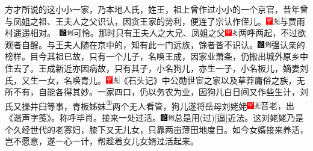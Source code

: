 方才所说的这小小一家，乃本地人氏，姓王，祖上曾作过小小的一个京官，昔年曾与凤姐之祖、王夫人之父识认，因贪王家的势利，便连了宗认作侄儿。{{\includegraphics[width=3mm]{../Images/00002}\includegraphics[width=3mm]{../Images/00012}\footnotesize \kaishu 与贾雨村遥遥相对。　}\includegraphics[width=3mm]{../Images/00006}\includegraphics[width=3mm]{../Images/00011}\footnotesize \kaishu 可怜。}那时只有王夫人之大兄、凤姐之父{\includegraphics[width=3mm]{../Images/00002}\includegraphics[width=3mm]{../Images/00012}\footnotesize \kaishu 两呼两起，不过欲观者自醒。}与王夫人随在京中的，知有此一门远族，馀者皆不识认。{\includegraphics[width=3mm]{../Images/00006}\includegraphics[width=3mm]{../Images/00011}\footnotesize \kaishu 强认亲的榜样。}目今其祖已故，只有一个儿子，名唤王成，因家业萧条，仍搬出城外原乡中住去了。王成新近亦因病故，只有其子，小名狗儿，亦生一子，小名板儿，嫡妻刘氏，又生一女，名唤青儿。{\includegraphics[width=3mm]{../Images/00002}\includegraphics[width=3mm]{../Images/00012}\footnotesize \kaishu 《石头记》中公勋世宦之家以及草莽庸俗之族，无所不有，自能各得其妙。}一家四口，仍以务农为业，因狗儿白日间又作些生计，刘氏又操井臼等事，青板姊妹\href{../Text/part0010_split_000.html\#lnkback_1_a}{\textsuperscript{①}}两个无人看管，狗儿遂将岳母刘姥姥{\includegraphics[width=3mm]{../Images/00002}\includegraphics[width=3mm]{../Images/00012}\footnotesize \kaishu 音老，出《谐声字笺》。称呼毕肖。}接来一处过活。{\includegraphics[width=3mm]{../Images/00006}\includegraphics[width=3mm]{../Images/00011}\footnotesize \kaishu 总是用{(过)}{[}逼{]}近法。}这刘姥姥乃是个久经世代的老寡妇，膝下又无儿女，只靠两亩薄田地度日。如今女婿接来养活，岂不愿意，遂一心一计，帮趁着女儿女婿过活起来。

